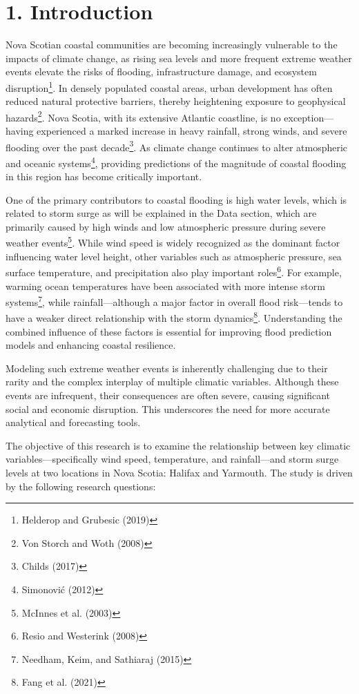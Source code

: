 \documentclass[
  letterpaper,
  DIV=11,
  numbers=noendperiod]{scrartcl}
\begin{document}
\section{1. Introduction}\label{introduction}

Nova Scotian coastal communities are becoming increasingly vulnerable to
the impacts of climate change, as rising sea levels and more frequent
extreme weather events elevate the risks of flooding, infrastructure
damage, and ecosystem disruption\footnote{Helderop and Grubesic (2019)}.
In densely populated coastal areas, urban development has often reduced
natural protective barriers, thereby heightening exposure to geophysical
hazards\footnote{Von Storch and Woth (2008)}. Nova Scotia, with its
extensive Atlantic coastline, is no exception---having experienced a
marked increase in heavy rainfall, strong winds, and severe flooding
over the past decade\footnote{Childs (2017)}. As climate change
continues to alter atmospheric and oceanic systems\footnote{Simonović
  (2012)}, providing predictions of the magnitude of coastal flooding in
this region has become critically important.

One of the primary contributors to coastal flooding is high water
levels, which is related to storm surge as will be explained in the Data
section, which are primarily caused by high winds and low atmospheric
pressure during severe weather events\footnote{McInnes et al. (2003)}.
While wind speed is widely recognized as the dominant factor influencing
water level height, other variables such as atmospheric pressure, sea
surface temperature, and precipitation also play important
roles\footnote{Resio and Westerink (2008)}. For example, warming ocean
temperatures have been associated with more intense storm
systems\footnote{Needham, Keim, and Sathiaraj (2015)}, while
rainfall---although a major factor in overall flood risk---tends to have
a weaker direct relationship with the storm dynamics\footnote{Fang et
  al. (2021)}. Understanding the combined influence of these factors is
essential for improving flood prediction models and enhancing coastal
resilience.

Modeling such extreme weather events is inherently challenging due to
their rarity and the complex interplay of multiple climatic variables.
Although these events are infrequent, their consequences are often
severe, causing significant social and economic disruption. This
underscores the need for more accurate analytical and forecasting tools.

The objective of this research is to examine the relationship between
key climatic variables---specifically wind speed, temperature, and
rainfall---and storm surge levels at two locations in Nova Scotia:
Halifax and Yarmouth. The study is driven by the following research
questions:
\end{document}
